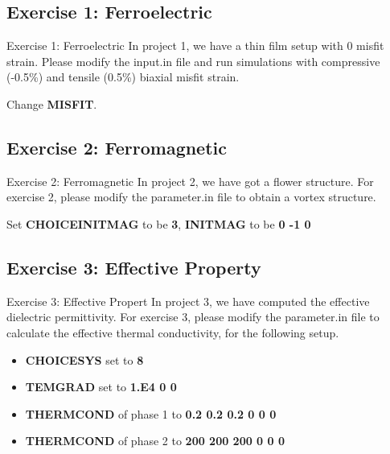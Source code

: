 \documentclass[11pt,aspectratio=169]{beamer}
\begin{document}
\subsection[Exercise 1: Ferroelectric]{Exercise 1: Ferroelectric}
\begin{frame}{Exercise 1: Ferroelectric}
In project 1, we have a thin film setup with 0 misfit strain. Please modify the input.in file and run simulations with compressive (-0.5\%) and tensile (0.5\%) biaxial misfit strain.

Change {\bf MISFIT}.
\end{frame}
\subsection[Exercise 2: Ferromagnetic]{Exercise 2: Ferromagnetic}
\begin{frame}{Exercise 2: Ferromagnetic}
In project 2, we have got a flower structure. For exercise 2, please modify the parameter.in file to obtain a vortex structure. 

Set {\bf CHOICEINITMAG} to be {\bf 3}, {\bf INITMAG} to be {\bf 0 -1 0}
\end{frame}
\subsection[Exercise 3: Effective Property]{Exercise 3: Effective Property}
\begin{frame}{Exercise 3: Effective Propert}
In project 3, we have computed the effective dielectric permittivity. For exercise 3, please modify the parameter.in file to calculate the effective thermal conductivity, for the following setup.

\begin{itemize}
    \item {\bf CHOICESYS} set to {\bf 8}
    \item {\bf TEMGRAD} set to {\bf 1.E4 0 0}
    \item {\bf THERMCOND} of phase 1 to {\bf 0.2 0.2 0.2 0 0 0}
    \item {\bf THERMCOND} of phase 2 to {\bf 200 200 200 0 0 0}
\end{itemize}

\end{frame}
\end{document}
